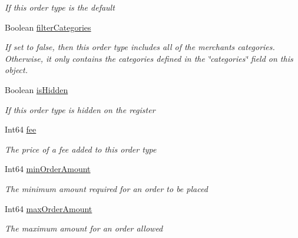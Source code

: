 \begin{DoxyCompactItemize}
\begin{DoxyCompactList}\small\item\em If this order type is the default \end{DoxyCompactList}\item 
Boolean \hyperlink{classcom_1_1clover_1_1sdk_1_1v3_1_1order_1_1_order_type_a331b93bc9bc80f2977df7f28a67dd1e2}{filter\+Categories}
\begin{DoxyCompactList}\small\item\em If set to false, then this order type includes all of the merchant\textquotesingle{}s categories. Otherwise, it only contains the categories defined in the \char`\"{}categories\char`\"{} field on this object. \end{DoxyCompactList}\item 
Boolean \hyperlink{classcom_1_1clover_1_1sdk_1_1v3_1_1order_1_1_order_type_a251227d503002a92c18f362966b464cd}{is\+Hidden}
\begin{DoxyCompactList}\small\item\em If this order type is hidden on the register \end{DoxyCompactList}\item 
Int64 \hyperlink{classcom_1_1clover_1_1sdk_1_1v3_1_1order_1_1_order_type_a5cc31266e2cb7a7030a4afb75e92c66b}{fee}
\begin{DoxyCompactList}\small\item\em The price of a fee added to this order type \end{DoxyCompactList}\item 
Int64 \hyperlink{classcom_1_1clover_1_1sdk_1_1v3_1_1order_1_1_order_type_af3980d12a202dda1f1c5a48637fde46e}{min\+Order\+Amount}
\begin{DoxyCompactList}\small\item\em The minimum amount required for an order to be placed \end{DoxyCompactList}\item 
Int64 \hyperlink{classcom_1_1clover_1_1sdk_1_1v3_1_1order_1_1_order_type_ac1c8fce2a3dd084bf14fcd1116599b52}{max\+Order\+Amount}
\begin{DoxyCompactList}\small\item\em The maximum amount for an order allowed \end{DoxyCompactList}\item 

\end{DoxyCompactItemize}

